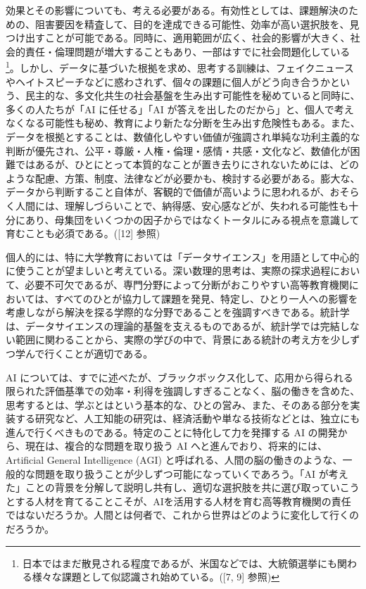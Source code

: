 \documentclass[
]{book}
\theoremstyle{definition}
\theoremstyle{definition}
\theoremstyle{definition}
\theoremstyle{definition}
\theoremstyle{remark}
\begin{document}
効果とその影響についても、考える必要がある。有効性としては、課題解決のための、阻害要因を精査して、目的を達成できる可能性、効率が高い選択肢を、見つけ出すことが可能である。同時に、適用範囲が広く、社会的影響が大きく、社会的責任・倫理問題が増大することもあり、一部はすでに社会問題化している\footnote{日本ではまだ散見される程度であるが、米国などでは、大統領選挙にも関わる様々な課題として似認識され始めている。({[}7, 9{]} 参照)}。しかし、データに基づいた根拠を求め、思考する訓練は、フェイクニュースやヘイトスピーチなどに惑わされず、個々の課題に個人がどう向き合うかという、民主的な、多文化共生の社会基盤を生み出す可能性を秘めていると同時に、多くの人たちが「AI に任せる」「AI が答えを出したのだから」と、個人で考えなくなる可能性も秘め、教育により新たな分断を生み出す危険性もある。また、データを根拠とすることは、数値化しやすい価値が強調され単純な功利主義的な判断が優先され、公平・尊厳・人権・倫理・感情・共感・文化など、数値化が困難ではあるが、ひとにとって本質的なことが置き去りにされないためには、どのような配慮、方策、制度、法律などが必要かも、検討する必要がある。膨大な、データから判断すること自体が、客観的で価値が高いように思われるが、おそらく人間には、理解しづらいことで、納得感、安心感などが、失われる可能性も十分にあり、母集団をいくつかの因子からではなくトータルにみる視点を意識して育むことも必須である。({[}12{]} 参照)

個人的には、特に大学教育においては「データサイエンス」を用語として中心的に使うことが望ましいと考えている。深い数理的思考は、実際の探求過程において、必要不可欠であるが、専門分野によって分断がおこりやすい高等教育機関においては、すべてのひとが協力して課題を発見、特定し、ひとり一人への影響を考慮しながら解決を探る学際的な分野であることを強調すべきである。統計学は、データサイエンスの理論的基盤を支えるものであるが、統計学では完結しない範囲に関わることから、実際の学びの中で、背景にある統計の考え方を少しずつ学んで行くことが適切である。

AI については、すでに述べたが、ブラックボックス化して、応用から得られる限られた評価基準での効率・利得を強調しすぎることなく、脳の働きを含めた、思考するとは、学ぶとはという基本的な、ひとの営み、また、そのある部分を実装する研究など、人工知能の研究は、経済活動や単なる技術などとは、独立にも進んで行くべきものである。特定のことに特化して力を発揮する AI の開発から、現在は、複合的な問題を取り扱う AI へと進んでおり、将来的には、Artificial General Intelligence (AGI) と呼ばれる、人間の脳の働きのような、一般的な問題を取り扱うことが少しずつ可能になっていくであろう。「AI が考えた」ことの背景を分解して説明し共有し、適切な選択肢を共に選び取っていこうとする人材を育てることこそが、AIを活用する人材を育む高等教育機関の責任ではないだろうか。人間とは何者で、これから世界はどのように変化して行くのだろうか。
\end{document}
